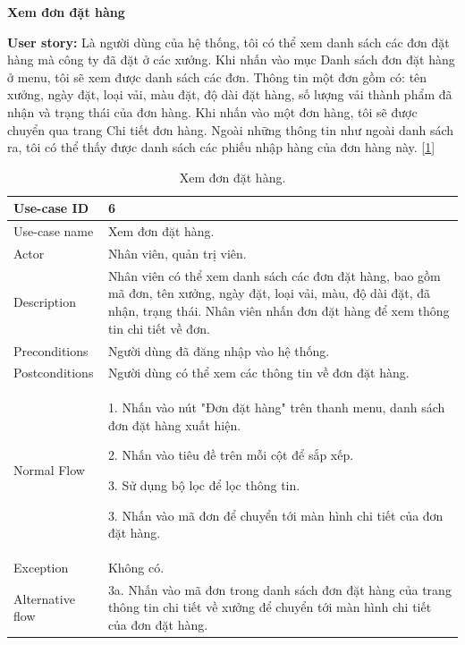 \newpage
\textbf{Xem đơn đặt hàng}\par
\textbf{User story:} Là người dùng của hệ thống, tôi có thể xem danh sách các đơn đặt hàng mà công ty đã đặt ở các xưởng. Khi nhấn vào mục Danh sách đơn đặt hàng ở menu, tôi sẽ xem được danh sách các đơn. Thông tin một đơn gồm có: tên xưởng, ngày đặt, loại vải, màu đặt, độ dài đặt hàng, số lượng vải thành phẩm đã nhận và trạng thái của đơn hàng. Khi nhấn vào một đơn hàng, tôi sẽ được chuyển qua trang Chi tiết đơn hàng. Ngoài những thông tin như ngoài danh sách ra, tôi có thể thấy được danh sách các phiếu nhập hàng của đơn hàng này. [\ref{bang6}]
\begin{table}[!htp]
    \centering
    \begin{tabular}{|m{3cm}|m{10cm}|}
    \hline 
        Use-case ID & 6\\ \hline
        Use-case name & Xem đơn đặt hàng.\\ \hline
        Actor & Nhân viên, quản trị viên.\\ \hline
        Description & Nhân viên có thể xem danh sách các đơn đặt hàng, bao gồm mã đơn, tên xưởng, ngày đặt, loại vải, màu, độ dài đặt, đã nhận, trạng thái. Nhân viên nhấn đơn đặt hàng để xem thông tin chi tiết về đơn.\\ \hline
        Preconditions & Người dùng đã đăng nhập vào hệ thống.\\ \hline
        Postconditions & Người dùng có thể xem các thông tin về đơn đặt hàng.\\ \hline
        Normal Flow & 
        1. Nhấn vào nút "Đơn đặt hàng" trên thanh menu, danh sách đơn đặt hàng xuất hiện.\par
        2. Nhấn vào tiêu đề trên mỗi cột để sắp xếp.\par
        3. Sử dụng bộ lọc để lọc thông tin.\par
        3. Nhấn vào mã đơn để chuyển tới màn hình chi tiết của đơn đặt hàng.
        \\ \hline
        Exception & Không có.\\ \hline
        Alternative flow & 
        3a. Nhấn vào mã đơn trong danh sách đơn đặt hàng của trang thông tin chi tiết về xưởng để chuyển tới màn hình chi tiết của đơn đặt hàng.
        \\ 
    \hline 
    \end{tabular}
    \caption{Xem đơn đặt hàng.}
    \label{bang6}
\end{table}

